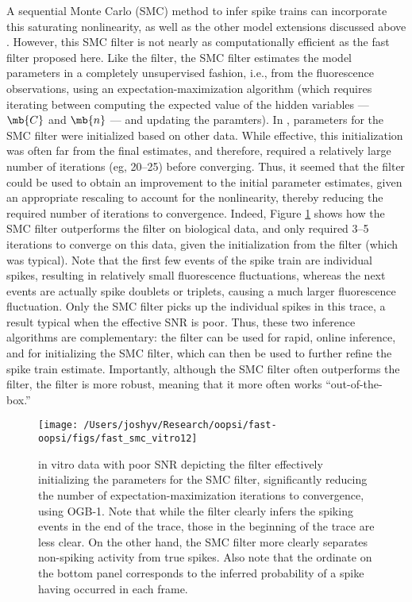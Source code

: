 A sequential Monte Carlo (SMC) method to infer spike trains can incorporate this saturating nonlinearity, as well as the other model extensions discussed above \cite{VogelsteinPaninski09} . However, this SMC filter is not nearly as computationally efficient as the fast filter proposed here.  Like the \foopsi filter, the SMC filter estimates the model parameters in a completely unsupervised fashion, i.e.,  from the fluorescence observations, using an expectation-maximization algorithm (which requires iterating between computing the expected value of the hidden variables --- $\mb{C}$ and $\mb{n}$ --- and updating the paramters).  In \cite{VogelsteinPaninski09}, parameters for the SMC filter were initialized based on other data.  While effective, this initialization was often far from the final estimates, and therefore, required a relatively large number of iterations (eg, 20--25) before converging.  Thus, it seemed that the \foopsi filter could be used to obtain an improvement to the initial parameter estimates, given an appropriate rescaling to account for the nonlinearity, thereby reducing the required number of iterations to convergence.  Indeed, Figure \ref{fig:smc_init} shows how the SMC filter outperforms the \foopsi filter on biological data, and only required 3--5 iterations to converge on this data, given the initialization from the \foopsi filter (which was typical).  Note that the first few events of the spike train are individual spikes, resulting in relatively small fluorescence fluctuations, whereas the next events are actually spike doublets or triplets, causing a much larger fluorescence fluctuation.  Only the SMC filter picks up the individual spikes in this trace, a result typical when the effective SNR is poor.  Thus, these two inference algorithms are complementary: the \foopsi filter can be used for rapid, online inference, and for initializing the SMC filter, which can then be used to further refine the spike train estimate.  Importantly, although the SMC filter often outperforms the \foopsi filter, the \foopsi filter is more robust, meaning that it more often works ``out-of-the-box.''

\begin{figure}[h!]
\centering \texttt{[image: /Users/joshyv/Research/oopsi/fast-oopsi/figs/fast\_smc\_vitro12]}
\caption[\foopsi filter can initialize Wiener filter]{in vitro data with poor SNR depicting the \foopsi filter effectively initializing the parameters for the SMC filter, significantly reducing the number of expectation-maximization iterations to convergence, using OGB-1.  Note that while the \foopsi filter clearly infers the spiking events in the end of the trace, those in the beginning of the trace are less clear.  On the other hand, the SMC filter more clearly separates non-spiking activity from true spikes.  Also note that the ordinate on the bottom panel corresponds to the inferred probability of a spike having occurred in each frame.} \label{fig:smc_init}
\end{figure}

